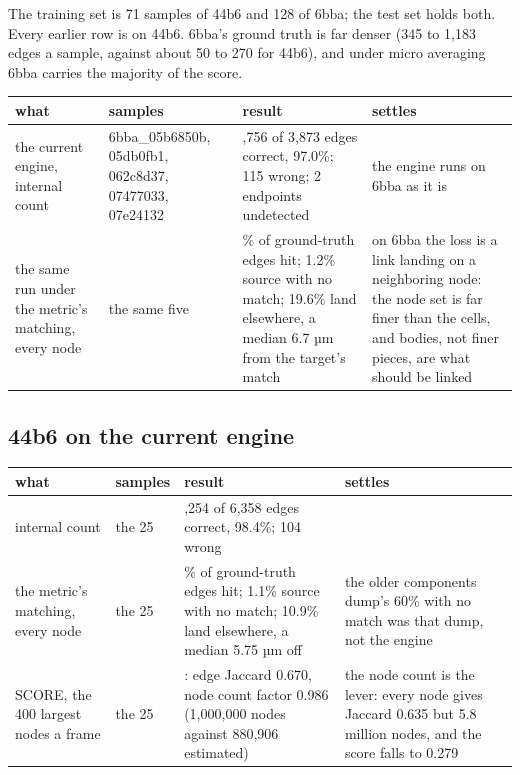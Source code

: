 The training set is 71 samples of 44b6 and 128 of 6bba; the test set holds both. Every earlier row is on 44b6. 6bba's ground truth is far denser (345 to 1,183 edges a sample, against about 50 to 270 for 44b6), and under micro averaging 6bba carries the majority of the score.

{\footnotesize
\setlength{\tabcolsep}{6pt}
\begin{longtable}{>{\RaggedRight\arraybackslash}p{}>{\RaggedRight\arraybackslash}p{}>{\RaggedRight\arraybackslash}p{}>{\RaggedRight\arraybackslash}p{}}
\toprule
what & samples & result & settles \\
\midrule
\endhead
the current engine, internal count & 6bba\_\allowbreak{}05b6850b, 05db0fb1, 062c8d37, 07477033, 07e24132 & 3,756 of 3,873 edges correct, 97.0\%; 115 wrong; 2 endpoints undetected & the engine runs on 6bba as it is \\
the same run under the metric's matching, every node & the same five & 78.5\% of ground-truth edges hit; 1.2\% source with no match; 19.6\% land elsewhere, a median 6.7 µm from the target's match & on 6bba the loss is a link landing on a neighboring node: the node set is far finer than the cells, and bodies, not finer pieces, are what should be linked \\
\bottomrule
\end{longtable}
}

\subsection{\texorpdfstring{44b6 on the current engine}{44b6 on the current engine}}

{\footnotesize
\setlength{\tabcolsep}{6pt}
\begin{longtable}{>{\RaggedRight\arraybackslash}p{}>{\RaggedRight\arraybackslash}p{}>{\RaggedRight\arraybackslash}p{}>{\RaggedRight\arraybackslash}p{}}
\toprule
what & samples & result & settles \\
\midrule
\endhead
internal count & the 25 & 6,254 of 6,358 edges correct, 98.4\%; 104 wrong &  \\
the metric's matching, every node & the 25 & 87.1\% of ground-truth edges hit; 1.1\% source with no match; 10.9\% land elsewhere, a median 5.75 µm off & the older components dump's 60\% with no match was that dump, not the engine \\
SCORE, the 400 largest nodes a frame & the 25 & 0.661: edge Jaccard 0.670, node count factor 0.986 (1,000,000 nodes against 880,906 estimated) & the node count is the lever: every node gives Jaccard 0.635 but 5.8 million nodes, and the score falls to 0.279 \\
\bottomrule
\end{longtable}
}
